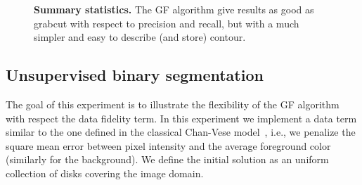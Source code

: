 \documentclass[smallextended]{svjour3}
\begin{document}
\begin{figure}
\center
{}


\caption{\textbf{Summary statistics.} The GF algorithm give results as good as grabcut with respect to precision and recall, but with a much simpler and easy to describe (and store) contour.}
\end{figure}
%
%
%
\subsection{Unsupervised binary segmentation}
The goal of this experiment is to illustrate the flexibility of the GF algorithm with respect the data fidelity term. In this experiment we implement a data term similar to the one defined in the classical
Chan-Vese model~\cite{chan01}, i.e., we penalize the square mean error between pixel intensity and the average foreground color (similarly for the background). We define the initial solution as an uniform collection of disks covering the image domain.
\end{document}
